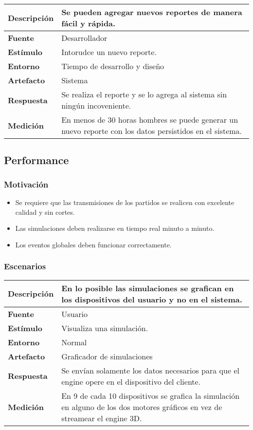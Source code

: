 \begin{center}
  \begin{tabular}{| l | p{10cm} | }
    \hline
	\textbf{Descripción} & Se pueden agregar nuevos reportes de manera fácil y rápida.\\  \hline
	\textbf{Fuente} & Desarrollador\\  \hline
	\textbf{Estímulo} & Intorudce un nuevo reporte.\\  \hline
	\textbf{Entorno} & Tiempo de desarrollo y diseño\\  \hline
	\textbf{Artefacto} & Sistema\\  \hline
	\textbf{Respuesta} & Se realiza el reporte y se lo agrega al sistema sin ningún incoveniente.\\  \hline
	\textbf{Medición} & En menos de 30 horas hombres se puede generar un nuevo reporte con los datos persistidos en el sistema.\\  \hline
  \end{tabular}
\end{center}

\subsection{Performance}

\subsubsection*{Motivación}
\begin{itemize}
\item Se requiere que las transmisiones de los partidos se realicen con excelente calidad y sin cortes.
\item Las simulaciones deben realizarse en tiempo real minuto a minuto.
\item Los eventos globales deben funcionar correctamente.
\end{itemize}

\subsubsection*{Escenarios}
\begin{center}
  \begin{tabular}{| l | p{10cm} | }
    \hline
	\textbf{Descripción} & En lo posible las simulaciones se grafican en los dispositivos del usuario y no en el sistema.\\ \hline
	\textbf{Fuente} & Usuario\\  \hline
	\textbf{Estímulo} & Visualiza una simulación.\\  \hline
	\textbf{Entorno} & Normal\\  \hline
	\textbf{Artefacto} & Graficador de simulaciones\\  \hline
	\textbf{Respuesta} & Se envían solamente los datos necesarios para que el engine opere en el dispositivo del cliente.\\ \hline
	\textbf{Medición} & En 9 de cada 10 dispositivos se grafica la simulación en alguno de los dos motores gráficos en vez de streamear el engine 3D.\\  \hline
  \end{tabular}
\end{center} 

